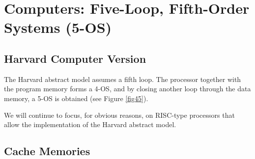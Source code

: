 \chapter{Computers: Five-Loop, Fifth-Order Systems (5-OS)}\label{lect6a}
\localtoc



\section{Harvard Computer Version}

The Harvard abstract model assumes a fifth loop. The processor together with the program memory forms a 4-OS, and by closing another loop through the data memory, a 5-OS is obtained (see Figure \ref{fig45}).


We will continue to focus, for obvious reasons, on RISC-type processors that allow the implementation of the Harvard abstract model.

\section{Cache Memories}